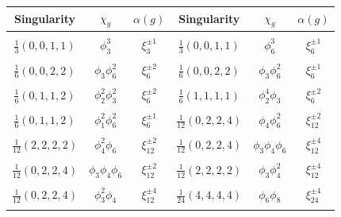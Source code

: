 \documentclass[12pt, a4paper]{article}
\begin{document}
\begin{table}\centering
  \begin{tabular}{|c|c|c||c|c|c|}
    \hline 
    \textbf{Singularity} & $\chi_g$ & $\alpha(g)$ &  \textbf{Singularity} & $\chi_g$ & $\alpha(g)$  \\ 
    \hline
    & & & & & \\[-1em]
    $\frac{1}{3}(0,0,1,1)$ & $\phi_{3}^{3} $& $\xi_{3}^{\pm 1}$ &
    
   
    $\frac{1}{3}(0,0,1,1)$ & $\phi_{6}^{3} $& $\xi_{6}^{\pm 1}$ \\
    & & & & & \\[-1em]
  
    
    $\frac{1}{6}(0,0,2,2)$ & $\phi_{3} \phi_{6}^{2} $& $\xi_{6}^{\pm 2}$ &  
    
    $\frac{1}{6}(0,0,2,2)$ & $\phi_{3} \phi_{6}^{2} $& $\xi_6^{\pm 1}$ \\
    & & & & & \\[-1em]
      
    $\frac{1}{6}(0,1,1,2)$ & $\phi_{2}^{2} \phi_{3}^{2} $& $\xi_{6}^{\pm 2}$ &  
    
    $\frac{1}{6}(1,1,1,1)$ & $\phi_{2}^{4} \phi_{3} $& $\xi_{6}^{\pm 2}$ \\
      & & & & & \\[-1em]
  
    
    $\frac{1}{6}(0,1,1,2)$ & $\phi_{1}^{2} \phi_{6}^{2} $& $\xi_{6}^{\pm 1}$ &  


    $\frac{1}{12}(0,2,2,4)$ & $\phi_{4} \phi_{6}^{2} $& $\xi_{12}^{\pm 2}$ \\
      & & & & & \\[-1em]
  
    
    $\frac{1}{12}(2,2,2,2)$ & $\phi_{4}^{2} \phi_{6} $& $\xi_{12}^{\pm 2}$ &  
    
    $\frac{1}{12}(0,2,2,4)$ & $\phi_{3} \phi_{4} \phi_{6} $& $\xi_{12}^{\pm 4}$ \\
    & & & & & \\[-1em]
  
    
    $\frac{1}{12}(0,2,2,4)$ & $\phi_{3} \phi_{4} \phi_{6} $& $\xi_{12}^{\pm 2}$ &  
    
    $\frac{1}{12}(2,2,2,2)$ & $\phi_{3} \phi_{4}^{2} $& $\xi_{12}^{\pm 4}$ \\
      & & & & & \\[-1em]
  
    
    $\frac{1}{12}(0,2,2,4)$ & $\phi_{3}^{2} \phi_{4} $& $\xi_{12}^{\pm 4}$ &  
    
    $\frac{1}{24}(4,4,4,4)$ & $\phi_{6} \phi_{8} $& $\xi_{24}^{\pm 4}$ \\ 
    & & & & & \\[-1em]
    

\end{tabular}
\end{table}
\end{document}

